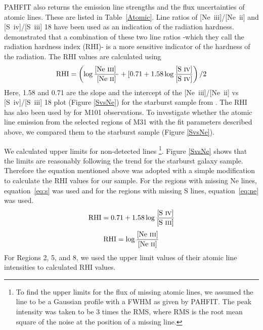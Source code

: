 PAHFIT also returns the emission line strengths and the flux uncertainties of atomic lines. These are listed in Table~\ref{Atomic}.
Line ratios of [Ne~{\sc iii}]/[Ne~{\sc ii}] and [S~{\sc iv}]/[S~{\sc iii}] 18 have been used as an indication of the radiation hardness. \citet{Engelbracht_2008} demonstrated that a combination of these two line ratios -which they call the radiation hardness index (RHI)- is a more sensitive indicator of the hardness of the radiation. The RHI values are calculated using
\begin{equation}
{\rm RHI} = \left( \log\frac{\textrm{[Ne~{\sc iii}] }}{\textrm{[Ne~{\sc ii}]}} + [0.71 + 1.58\log\frac{\textrm{{[S~{\sc iv}]}}}{\textrm{{[S~{\sc iv}]}}}\right) /2
\end{equation}
Here, 1.58 and 0.71 are the slope and the intercept of the [Ne~{\sc iii}]/[Ne~{\sc ii}]  vs [S~{\sc iv}]/[S~{\sc iii}] 18 plot (Figure \ref{SvsNe}) for the starburst sample from 
\citet{Engelbracht_2008}. The RHI has also been used by \citet{Gordon:2008lr} for M101 observations. To investigate whether the atomic line emission from the selected regions of M31 with the fit parameters described above, we compared them to the starburst sample (Figure \ref{SvsNe}). 
	
We calculated upper limits for non-detected lines \footnote{To find the upper limits for the flux of missing atomic lines, we assumed the line to be a 
Gaussian profile with a FWHM as given by PAHFIT. The peak intensity was taken to be 3 times the RMS, where RMS is the root mean square of 
the noise at the position of a missing line.}. Figure \ref{SvsNe}  shows that the limits are reasonably following the trend for the starburst galaxy sample. 
Therefore the equation mentioned above was adopted with a simple modification to calculate the RHI values for our sample. For the regions with missing Ne lines, 
equation~\ref{eq:s} was used and for the regions with missing S lines, equation~\ref{eq:ne} was used. 
\begin{equation}
{\rm RHI} = 0.71 + 1.58\log\frac{\textrm{[S~{\sc iv}]}}{\textrm{[S~{\sc iii}]}}
\label{eq:s}	
\end{equation}
\begin{equation}
{\rm RHI} = \log\frac{\textrm{[Ne~{\sc iii}]}}{\textrm{[Ne~{\sc ii}]}}
\label{eq:ne}	
\end{equation}
For Regions 2, 5, and 8, we used the upper limit values of their atomic line intensities to calculated RHI values.
